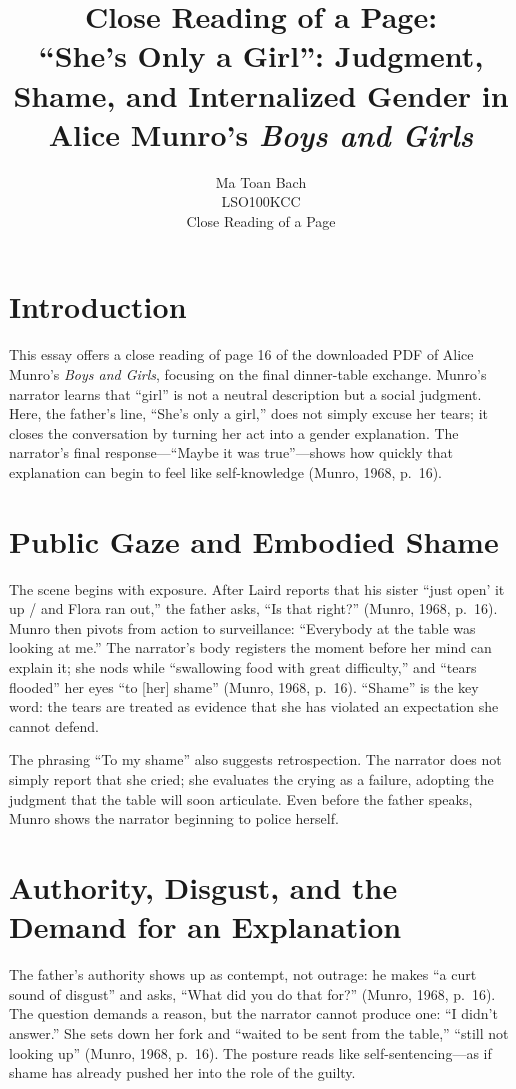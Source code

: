 \documentclass[12pt]{article}
\title{Close Reading of a Page:\\
``She's Only a Girl'': Judgment, Shame, and Internalized Gender in Alice Munro's \textit{Boys and Girls}}
\author{%
  Ma Toan Bach\\
  LSO100KCC\\
  Close Reading of a Page
}
\date{}
\begin{document}
\maketitle

\section{Introduction}
This essay offers a close reading of page 16 of the downloaded PDF of Alice Munro's \textit{Boys and Girls}, focusing on the final dinner-table exchange. Munro's narrator learns that ``girl'' is not a neutral description but a social judgment. Here, the father's line, ``She's only a girl,'' does not simply excuse her tears; it closes the conversation by turning her act into a gender explanation. The narrator's final response---``Maybe it was true''---shows how quickly that explanation can begin to feel like self-knowledge (Munro, 1968, p.~16).

\section{Public Gaze and Embodied Shame}
The scene begins with exposure. After Laird reports that his sister ``just open' it up / and Flora ran out,'' the father asks, ``Is that right?'' (Munro, 1968, p.~16). Munro then pivots from action to surveillance: ``Everybody at the table was looking at me.'' The narrator's body registers the moment before her mind can explain it; she nods while ``swallowing food with great difficulty,'' and ``tears flooded'' her eyes ``to [her] shame'' (Munro, 1968, p.~16). ``Shame'' is the key word: the tears are treated as evidence that she has violated an expectation she cannot defend.

The phrasing ``To my shame'' also suggests retrospection. The narrator does not simply report that she cried; she evaluates the crying as a failure, adopting the judgment that the table will soon articulate. Even before the father speaks, Munro shows the narrator beginning to police herself.

\section{Authority, Disgust, and the Demand for an Explanation}
The father's authority shows up as contempt, not outrage: he makes ``a curt sound of disgust'' and asks, ``What did you do that for?'' (Munro, 1968, p.~16). The question demands a reason, but the narrator cannot produce one: ``I didn't answer.'' She sets down her fork and ``waited to be sent from the table,'' ``still not looking up'' (Munro, 1968, p.~16). The posture reads like self-sentencing---as if shame has already pushed her into the role of the guilty.
\end{document}
